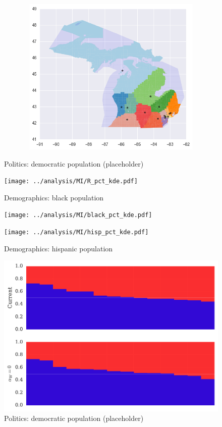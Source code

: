\begin{figure}[htb!]
\includegraphics[width=5in,height=3in,keepaspectratio]{../maps/MI/static/0_25_after.png}
\end{figure}

\clearpage
\newpage

\begin{figure}[htb!] \centering
\caption{ Politics: democratic population (placeholder)}
\texttt{[image: ../analysis/MI/R\_pct\_kde.pdf]}
\caption{ Demographics: black population }
\texttt{[image: ../analysis/MI/black\_pct\_kde.pdf]}
\caption{ Demographics: hispanic population }
\texttt{[image: ../analysis/MI/hisp\_pct\_kde.pdf]}
\end{figure}

\clearpage
\newpage

\begin{figure}[htb!] \centering
\caption{ Politics: democratic population (placeholder)}
\includegraphics[width=6in]{../analysis/MI/barplot.pdf}
\end{figure}

